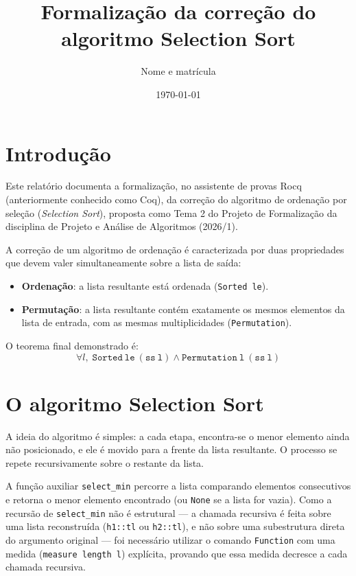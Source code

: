 \documentclass{article}
\title{Formalização da correção do algoritmo Selection Sort}
\author{Nome e matrícula}
\date{\today}
\begin{document}
\maketitle

\section{Introdução}

Este relatório documenta a formalização, no assistente de provas Rocq (anteriormente
conhecido como Coq), da correção do algoritmo de ordenação por seleção
(\emph{Selection Sort}), proposta como Tema 2 do Projeto de Formalização da
disciplina de Projeto e Análise de Algoritmos (2026/1).

A correção de um algoritmo de ordenação é caracterizada por duas propriedades
que devem valer simultaneamente sobre a lista de saída:

\begin{itemize}
  \item \textbf{Ordenação}: a lista resultante está ordenada (\texttt{Sorted le}).
  \item \textbf{Permutação}: a lista resultante contém exatamente os mesmos
        elementos da lista de entrada, com as mesmas multiplicidades
        (\texttt{Permutation}).
\end{itemize}

O teorema final demonstrado é:
\[
\forall l,\; \mathtt{Sorted\ le\ (ss\ l)} \land \mathtt{Permutation\ l\ (ss\ l)}
\]

\section{O algoritmo Selection Sort}

A ideia do algoritmo é simples: a cada etapa, encontra-se o menor elemento
ainda não posicionado, e ele é movido para a frente da lista resultante. O
processo se repete recursivamente sobre o restante da lista.

A função auxiliar \texttt{select\_min} percorre a lista comparando elementos
consecutivos e retorna o menor elemento encontrado (ou \texttt{None} se a
lista for vazia). Como a recursão de \texttt{select\_min} não é estrutural —
a chamada recursiva é feita sobre uma lista reconstruída (\texttt{h1::tl} ou
\texttt{h2::tl}), e não sobre uma subestrutura direta do argumento original —
foi necessário utilizar o comando \texttt{Function} com uma medida
(\texttt{measure length l}) explícita, provando que essa medida decresce a
cada chamada recursiva.
\end{document}
